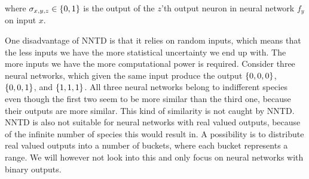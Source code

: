 where $\sigma_{x ,y, z} \in \{ 0, 1 \}$ is the output of the $z$'th output neuron in neural network $f_y$ on input $x$.

One disadvantage of NNTD is that it relies on random inputs, which means that the less inputs we have the more statistical uncertainty we end up with. The more inputs we have the more computational power is required. Consider three neural networks, which given the same input produce the output $\{ 0, 0, 0 \}$, $\{ 0, 0, 1 \}$, and $\{ 1, 1, 1 \}$. All three neural networks belong to indifferent species even though the first two seem to be more similar than the third one, because their outputs are more similar. This kind of similarity is not caught by NNTD\@. NNTD is also not suitable for neural networks with real valued outputs, because of the infinite number of species this would result in. A possibility is to distribute real valued outputs into a number of buckets, where each bucket represents a range. We will however not look into this and only focus on neural networks with binary outputs.
